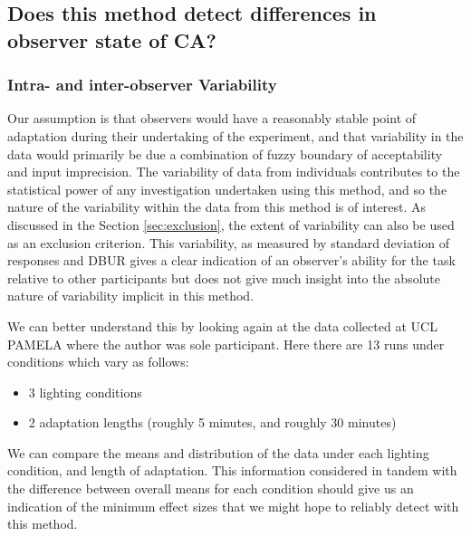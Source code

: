 \subsection{Does this method detect differences in observer state of CA?}

\subsubsection{Intra- and inter-observer Variability}

Our assumption is that observers would have a reasonably stable point of adaptation during their undertaking of the experiment, and that variability in the data would primarily be due a combination of fuzzy boundary of acceptability and input imprecision. The variability of data from individuals contributes to the statistical power of any investigation undertaken using this method, and so the nature of the variability within the data from this method is of interest. As discussed in the Section \ref{sec:exclusion}, the extent of variability can also be used as an exclusion criterion. This variability, as measured by standard deviation of responses and \gls{DBUR} gives a clear indication of an observer's ability for the task relative to other participants but does not give much insight into the absolute nature of variability implicit in this method.

We can better understand this by looking again at the data collected at \gls{UCL} \gls{PAMELA} where the author was sole participant. Here there are 13 runs under conditions which vary as follows:

\begin{itemize}
    \item 3 lighting conditions
    \item 2 adaptation lengths (roughly 5 minutes, and roughly 30 minutes)
\end{itemize}
	
We can compare the means and distribution of the data under each lighting condition, and length of adaptation. This information considered in tandem with the difference between overall means for each condition should give us an indication of the minimum effect sizes that we might hope to reliably detect with this method.

